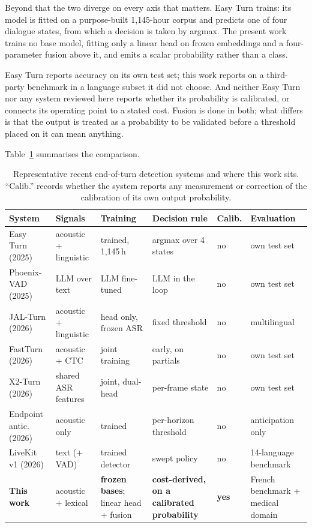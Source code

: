 Beyond that the two diverge on every axis that matters. Easy Turn trains: its
model is fitted on a purpose-built 1{,}145-hour corpus and predicts one of four dialogue
states, from which a decision is taken by argmax. The present work trains no base model,
fitting only a linear head on frozen embeddings and a four-parameter fusion above it, and
emits a scalar probability rather than a class. 

Easy Turn reports accuracy on its own test set; this work reports on a third-party benchmark in a language subset it did not choose.
And neither Easy Turn nor any system reviewed here reports whether its probability is
calibrated, or connects its operating point to a stated cost. Fusion is done in both; what
differs is that the output is treated as a probability to be validated before a threshold
placed on it can mean anything.

Table~\ref{tab:related} summarises the comparison.

\begin{table}[H]
\centering
\caption[Recent turn-taking systems compared]{Representative recent end-of-turn detection
systems and where this work sits. ``Calib.'' records whether the system reports any
measurement or correction of the calibration of its own output probability.}
\label{tab:related}
\footnotesize
\setlength{\tabcolsep}{3pt}
\begin{tabular}{@{}p{2.2cm}p{2.4cm}p{2.5cm}p{2.8cm}p{1.0cm}p{2.5cm}@{}}
\toprule
System & Signals & Training & Decision rule & Calib. & Evaluation \\
\midrule
Easy Turn (2025) & acoustic + linguistic & trained, 1{,}145\,h & argmax over 4 states & no & own test set \\
Phoenix-VAD (2025) & LLM over text & LLM fine-tuned & LLM in the loop & no & own test set \\
JAL-Turn (2026) & acoustic + linguistic & head only, frozen ASR & fixed threshold & no & multilingual \\
FastTurn (2026) & acoustic + CTC & joint training & early, on partials & no & own test set \\
X2-Turn (2026) & shared ASR features & joint, dual-head & per-frame state & no & own test set \\
Endpoint antic. (2026) & acoustic only & trained & per-horizon threshold & no & anticipation only \\
LiveKit v1 (2026) & text (+ VAD) & trained detector & swept policy & no & 14-language benchmark \\
\midrule
\textbf{This work} & acoustic + lexical & \textbf{frozen bases}; linear head + fusion & \textbf{cost-derived, on a calibrated probability} & \textbf{yes} & French benchmark + medical domain \\
\bottomrule
\end{tabular}
\end{table}

